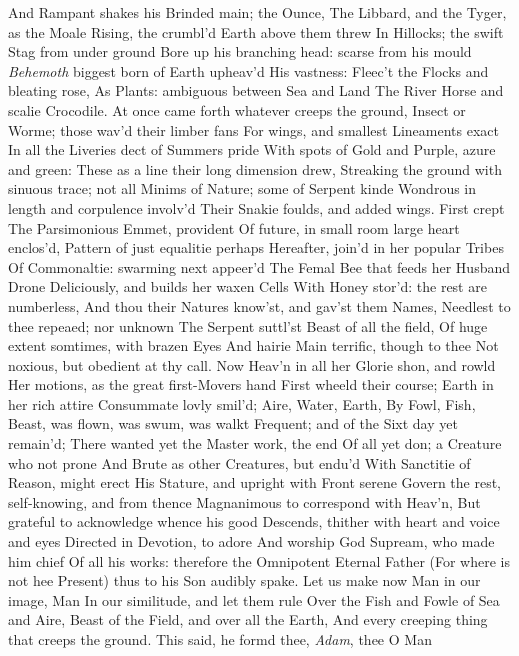 \documentclass[11pt]{book}
\newcounter {first}
\begin{document}
And Rampant shakes his Brinded main; the Ounce, 
The Libbard, and the Tyger, as the Moale 
Rising, the crumbl'd Earth above them threw 
In Hillocks; the swift Stag from under ground 
Bore up his branching head: scarse from his mould 
\textit{Behemoth} biggest born of Earth upheav'd 
His vastness: Fleec't the Flocks and bleating rose, 
As Plants: ambiguous between Sea and Land 
The River Horse and scalie Crocodile. 
At once came forth whatever creeps the ground, 
Insect or Worme; those wav'd their limber fans 
For wings, and smallest Lineaments exact 
In all the Liveries dect of Summers pride 
With spots of Gold and Purple, azure and green: 
These as a line their long dimension drew, 
Streaking the ground with sinuous trace; not all 
Minims of Nature; some of Serpent kinde 
Wondrous in length and corpulence involv'd 
Their Snakie foulds, and added wings.  First crept 
The Parsimonious Emmet, provident 
Of future, in small room large heart enclos'd, 
Pattern of just equalitie perhaps 
Hereafter, join'd in her popular Tribes 
Of Commonaltie: swarming next appeer'd 
The Femal Bee that feeds her Husband Drone 
Deliciously, and builds her waxen Cells 
With Honey stor'd: the rest are numberless, 
And thou their Natures know'st, and gav'st them Names, 
Needlest to thee repeaed; nor unknown 
The Serpent suttl'st Beast of all the field, 
Of huge extent somtimes, with brazen Eyes 
And hairie Main terrific, though to thee 
Not noxious, but obedient at thy call. 
Now Heav'n in all her Glorie shon, and rowld 
Her motions, as the great first-Movers hand 
First wheeld their course; Earth in her rich attire 
Consummate lovly smil'd; Aire, Water, Earth, 
By Fowl, Fish, Beast, was flown, was swum, was walkt 
Frequent; and of the Sixt day yet remain'd; 
There wanted yet the Master work, the end 
Of all yet don; a Creature who not prone 
And Brute as other Creatures, but endu'd 
With Sanctitie of Reason, might erect 
His Stature, and upright with Front serene 
Govern the rest, self-knowing, and from thence 
Magnanimous to correspond with Heav'n, 
But grateful to acknowledge whence his good 
Descends, thither with heart and voice and eyes 
Directed in Devotion, to adore 
And worship God Supream, who made him chief 
Of all his works: therefore the Omnipotent 
Eternal Father (For where is not hee 
Present) thus to his Son audibly spake. 
\quad Let us make now Man in our image, Man 
In our similitude, and let them rule 
Over the Fish and Fowle of Sea and Aire, 
Beast of the Field, and over all the Earth, 
And every creeping thing that creeps the ground. 
This said, he formd thee, \textit{Adam}, thee O Man 
\end{document}
